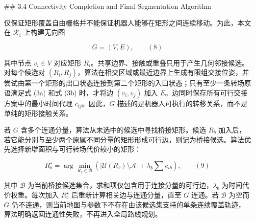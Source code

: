   

## 3.4 Connectivity Completion and Final Segmentation Algorithm

  

仅保证矩形覆盖自由栅格并不能保证机器人能够在矩形之间连续移动。为此，本文在 $\mathcal R_1$ 上构建无向图

  

$$
G=(V,E),
\qquad(8)
$$

  

其中节点 $v_i\in V$ 对应矩形 $R_i$。共享边界、接触或重叠只用于产生几何邻接候选。对每个候选对 $(R_i,R_j)$，算法在相交区域或最近边界上生成有限组交接位姿，并尝试由第一个矩形的出口状态连接到第二个矩形的入口状态；只有至少一条转场原语满足式 (3a) 和式 (3b) 时，才将边 $(v_i,v_j)$ 加入 $E$。边同时保存所有可行交接方案中的最小时间代理 $c_{ij}$。因此，$G$ 描述的是机器人可执行的转移关系，而不是单纯的矩形接触关系。

若 $G$ 含多个连通分量，算法从未选中的候选中寻找桥接矩形。候选 $R_b$ 加入后，若它能分别与至少两个原属不同分量的矩形形成可行边，则记为桥接候选。算法优先选择新增面积与可行转场代价较小的矩形：

  

$$
R_b^\star
=\arg\min_{R_b\in\mathcal B}
\left(|\mathcal U(R_b)\setminus\mathcal A|
+\lambda_b\sum c_{ib}\right),
\qquad(9)
$$

  

其中 $\mathcal B$ 为当前桥接候选集合，求和项仅包含用于连接分量的可行边，$\lambda_b$ 为时间代价权重。每次加入 $R_b^\star$ 后重新计算相关边与连通分量，直至 $G$ 连通。若 $\mathcal B$ 为空而 $G$ 仍不连通，则当前地图与参数下不存在由该候选集支持的单条连续覆盖轨迹，算法明确返回连通性失败，不再进入全局路线规划。

  

